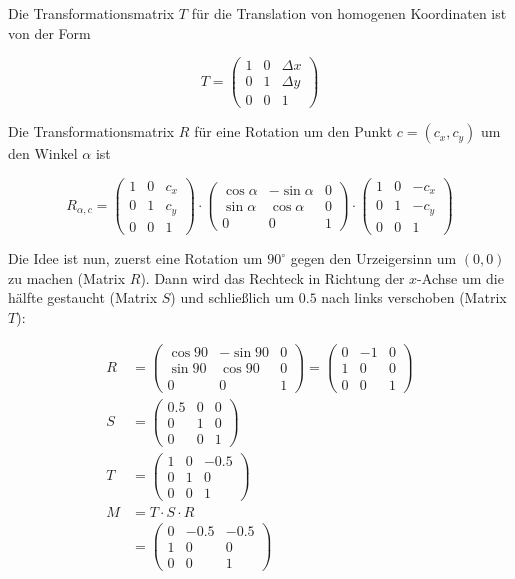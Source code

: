 \documentclass[a4paper]{scrartcl}
\begin{document}
Die Transformationsmatrix $T$ für die Translation von homogenen Koordinaten ist von der Form

\[T = \begin{pmatrix}1 & 0 & \Delta x\\0 & 1 & \Delta y\\0 & 0 & 1\end{pmatrix}\]

Die Transformationsmatrix $R$ für eine Rotation um den Punkt $c = (c_x, c_y)$ um den Winkel $\alpha$ ist

\[R_{\alpha, c} = \begin{pmatrix}          1 &            0 & c_x\\          0 &           1 & c_y\\0 & 0 & 1\end{pmatrix} \cdot
  \begin{pmatrix}\cos \alpha & -\sin \alpha &   0\\\sin \alpha & \cos \alpha &   0\\0 & 0 & 1\end{pmatrix} \cdot
  \begin{pmatrix}          1 &            0 &-c_x\\          0 &           1 &-c_y\\0 & 0 & 1\end{pmatrix}\]

Die Idee ist nun, zuerst eine Rotation um $90^\circ$ gegen den Urzeigersinn
um $(0, 0)$ zu machen (Matrix $R$). Dann wird das Rechteck in Richtung der $x$-Achse um
die hälfte gestaucht (Matrix $S$) und schließlich um $0.5$ nach links verschoben (Matrix $T$):

\begin{align}
    R &= \begin{pmatrix}\cos 90 & -\sin 90 &   0\\\sin 90 & \cos 90 &   0\\0 & 0 & 1\end{pmatrix}
       = \begin{pmatrix}0 & -1 &   0\\1 & 0 &   0\\0 & 0 & 1\end{pmatrix}\\
    S &= \begin{pmatrix}0.5 & 0 & 0\\0 & 1 & 0\\0 & 0 & 1\end{pmatrix}\\
    T &= \begin{pmatrix}1 & 0 & -0.5\\0 & 1 & 0\\0 & 0 & 1\end{pmatrix}\\
    M &= T \cdot S \cdot R\\
      &= \begin{pmatrix}0 & -0.5 & -0.5\\1 & 0 & 0\\0 & 0 & 1\end{pmatrix}
\end{align}
\end{document}
